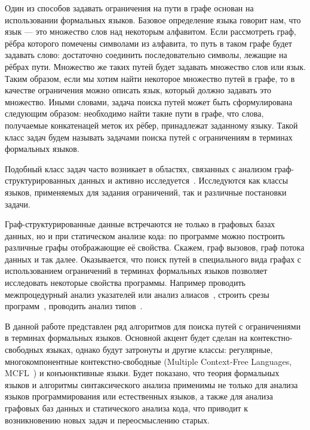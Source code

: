 Один из способов задавать ограничения на пути в графе основан на использовании формальных языков.
Базовое определение языка говорит нам, что язык --- это множество слов над некоторым алфавитом.
Если рассмотреть граф, рёбра которого помечены символами из алфавита, то путь в таком графе будет задавать слово: достаточно соединить последовательно символы, лежащие на рёбрах пути.
Множество же таких путей будет задавать множество слов или язык.
Таким образом, если мы хотим найти некоторое множество путей в графе, то в качестве ограничения можно описать язык, который должно задавать это множество.
Иными словами, задача поиска путей может быть сформулирована следующим образом: необходимо найти такие пути в графе, что слова, получаемые конкатенацей меток их рёбер, принадлежат заданному языку.
Такой класс задач будем называть задачами поиска путей с ограничениям в терминах формальных языков.

Подобный класс задач часто возникает в областях, связанных с анализом граф-структурированных данных и активно исследуется~\cite{doi:10.1137/S0097539798337716,axelsson2011formal,10.1007/978-3-642-22321-1_24,Ward:2010:CRL:1710158.1710234,barrett2007label,doi:10.1137/S0097539798337716}.
Исследуются как классы языков, применяемых для задания ограничений, так и различные постановки задачи.

Граф-структурированные данные встречаются не только в графовых базах данных, но и при статическом анализе кода: по программе можно построить различные графы отображающие её свойства.
Скажем, граф вызовов, граф потока данных и так далее.
Оказывается, что поиск путей в специального вида графах с использованием ограничений в терминах формальных языков позволяет исследовать некоторые свойства программы.
Например проводить межпроцедурный анализ указателей или анализ алиасов~\cite{Zheng,10.1145/2001420.2001440,10.1145/2714064.2660213}, строить срезы программ~\cite{10.1145/193173.195287}, проводить анализ типов~\cite{10.1145/373243.360208}.

В данной работе представлен ряд алгоритмов для поиска путей с ограничениями в терминах формальных языков.
Основной акцент будет сделан на контекстно-свободных языках, однако будут затронуты и другие классы: регулярные, многокомпонентные контекстно-свободные (Multiple Context-Free Languages, MCFL~\cite{!!!}) и конъюнктивные языки.
Будет показано, что теория формальных языков и алгоритмы синтаксического анализа применимы не только для анализа языков программирования или естественных языков, а также для анализа графовых баз данных и статического анализа кода, что приводит к возникновению новых задач и переосмыслению старых.


